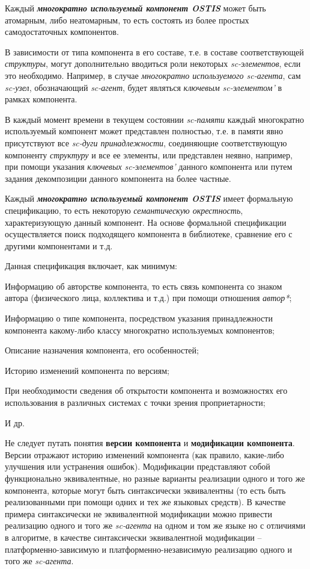 \begin{SCn}
{Каждый \textbf{\textit{многократно используемый компонент OSTIS}} может быть атомарным, либо неатомарным, то есть состоять из более простых самодостаточных компонентов.

В зависимости от типа компонента в его составе, т.е. в составе соответствующей \textit{структуры}, могут дополнительно вводиться роли некоторых \textit{sc-элементов}, если это необходимо. Например, в случае \textit{многократно используемого sc-агента}, сам \textit{sc-узел}, обозначающий \textit{sc-агент}, будет являться \textit{ключевым sc-элементом'} в рамках компонента.

В каждый момент времени в текущем состоянии \textit{sc-памяти} каждый многократно используемый компонент может представлен полностью, т.е. в памяти явно присутствуют все \textit{sc-дуги принадлежности}, соединяющие соответствующую компоненту \textit{структуру} и все ее элементы, или представлен неявно, например, при помощи указания \textit{ключевых sc-элементов'} данного компонента или путем задания декомпозиции данного компонента на более частные.

Каждый \textbf{\textit{многократно используемый компонент OSTIS}} имеет формальную спецификацию, то есть некоторую \textit{семантическую окрестность}, характеризующую данный компонент. На основе формальной спецификации осуществляется поиск подходящего компонента в библиотеке, сравнение его с другими компонентами и т.д.

Данная спецификация включает, как минимум:
\begin{scnitemize}
    \item Информацию об авторстве компонента, то есть связь компонента со знаком автора (физического лица, коллектива и т.д.) при помощи отношения \textit{автор*};
    \item Информацию о типе компонента, посредством указания принадлежности компонента какому-либо классу многократно используемых компонентов;
    \item Описание назначения компонента, его особенностей;
    \item Историю изменений компонента по версиям;
    \item При необходимости сведения об открытости компонента и возможностях его использования в различных системах с точки зрения проприетарности;
    \item И др.
\end{scnitemize}
Не следует путать понятия \textbf{версии компонента} и \textbf{модификации компонента}. Версии отражают историю изменений компонента (как правило, какие-либо улучшения или устранения ошибок). Модификации представляют собой функционально эквивалентные, но разные варианты реализации одного и того же компонента, которые могут быть синтаксически эквивалентны (то есть быть реализованными при помощи одних и тех же языковых средств). В качестве примера синтаксически не эквивалентной модификации можно привести реализацию одного и того же \textit{sc-агента} на одном и том же языке но с отличиями в алгоритме, в качестве синтаксически эквивалентной модификации – платформенно-зависимую и платформенно-независимую реализацию одного и того же \textit{sc-агента}.

}
\end{SCn}
